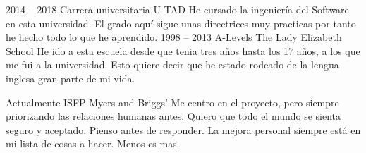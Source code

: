 \documentclass[9pt]{developercv} %
\begin{document}


\begin{entrylist}
	\entry
		{2014 -- 2018}
		{Carrera universitaria}
		{U-TAD}
		{He cursado la ingeniería del Software en esta universidad. El grado aquí sigue unas directrices muy practicas por tanto he hecho todo lo que he aprendido.}
	\entry
		{1998 -- 2013}
		{A-Levels}
		{The Lady Elizabeth School}
    {He ido a esta escuela desde que tenia tres años hasta los 17 años, a los que me fui a la universidad. Esto quiere decir que he estado rodeado de la lengua inglesa gran parte de mi vida.}
\end{entrylist}


\begin{entrylist}
	\entry
		{Actualmente}
		{ISFP}
		{Myers and Briggs'}
		{Me centro en el proyecto, pero siempre priorizando las relaciones humanas antes.
		Quiero que todo el mundo se sienta seguro y aceptado.
		Pienso antes de responder.
		La mejora personal siempre está en mi lista de cosas a hacer.
		Menos es mas.}
\end{entrylist}

\end{document}
